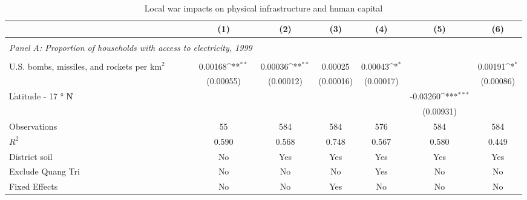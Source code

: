 \begin{table}[htbp]\centering \\ \def\sym#1{\ifmmode^{#1}\else\(^{#1}\)\fi} \\ \caption{Local war impacts on physical infrastructure and human capital} \\ \begin{tabular}{l*{6}{c}} \hline\hline
                    &\multicolumn{1}{c}{(1)}         &\multicolumn{1}{c}{(2)}         &\multicolumn{1}{c}{(3)}         &\multicolumn{1}{c}{(4)}         &\multicolumn{1}{c}{(5)}         &\multicolumn{1}{c}{(6)}         \\
\hline \\ \multicolumn{2}{c}{\emph{Panel A: Proportion of households with access to electricity, 1999}} \\\\[-1ex]
U.S. bombs, missiles, and rockets per km$^2$&     0.00168\sym{**} &     0.00036\sym{**} &     0.00025         &     0.00043\sym{*}  &                     &     0.00191\sym{*}  \\
                    &   (0.00055)         &   (0.00012)         &   (0.00016)         &   (0.00017)         &                     &   (0.00086)         \\
[1em]
\|Latitude - 17 $°$ N\|&                     &                     &                     &                     &    -0.03260\sym{***}&                     \\
                    &                     &                     &                     &                     &   (0.00931)         &                     \\
\hline
Observations        &          55         &         584         &         584         &         576         &         584         &         584         \\
\(R^{2}\)           &       0.590         &       0.568         &       0.748         &       0.567         &       0.580         &       0.449         \\
District soil       &          No         &         Yes         &         Yes         &         Yes         &         Yes         &         Yes         \\
Exclude Quang Tri   &          No         &          No         &          No         &         Yes         &          No         &          No         \\
Fixed Effects       &          No         &          No         &         Yes         &          No         &          No         &          No         \\

\end{tabular}
\end{table}
